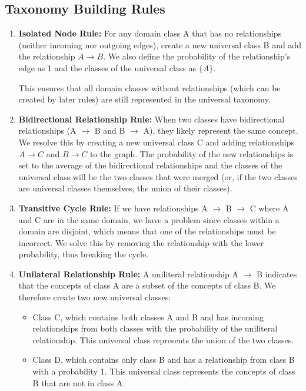 \subsection{Taxonomy Building Rules}

\begin{enumerate}
    \item \textbf{Isolated Node Rule:} For any domain class A that has no relationships
          (neither incoming nor outgoing edges), create a new universal class B
          and add the relationship $A \rightarrow B$.
          We also define the probability of the relationship's edge as 1 and
          the classes of the universal class as $\{A\}$.

          This ensures that all domain classes without relationships (which can be created by later rules)
          are still represented in the universal taxonomy.

    \item \textbf{Bidirectional Relationship Rule:} When two classes have bidirectional relationships
          (A $\rightarrow$ B and B $\rightarrow$ A), they likely represent the same concept.
          We resolve this by creating a new universal class C and adding relationships
          $A \rightarrow C$ and $B \rightarrow C$ to the graph.
          The probability of the new relationships is set to the average of the bidirectional relationships and the classes of the universal class
          will be the two classes that were merged (or, if the two classes are universal classes themselves,
          the union of their classes).

    \item \textbf{Transitive Cycle Rule:} If we have relationships A $\rightarrow$ B $\rightarrow$ C
          where A and C are in the same domain, we have a problem since classes within a domain
          are disjoint, which means that one of the relationships must be incorrect.
          We solve this by removing the relationship with the lower probability,
          thus breaking the cycle.

    \item \textbf{Unilateral Relationship Rule:} A uniliteral relationship
          A $\rightarrow$ B indicates that the concepts of class A are a subset of the concepts of class B.
          We therefore create two new universal classes:
          \begin{itemize}
              \item Class C, which contains both classes A and B and has incoming relationships
                    from both classes with the probability of the uniliteral relationship.
                    This universal class represents the union of the two classes.
              \item Class D, which contains only class B and has a relationship from class B with a probability 1.
                    This universal class represents the concepts of class B that are not in class A.
          \end{itemize}
\end{enumerate}

